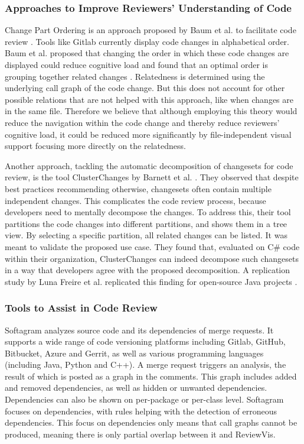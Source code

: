 \documentclass[a4paper,11pt,twoside]{article}
\theoremstyle{definition} %
\renewcommand{\cite}[1]{\citep{#1}}
\begin{document}
\subsubsection{Approaches to Improve Reviewers’ Understanding of Code} \label{SubSubSec:ImprovCodeUnderstanding}
Change Part Ordering is an approach proposed by Baum et al. to facilitate code review \cite{baum2017optimal}. Tools like Gitlab currently display code changes in alphabetical order. Baum et al. proposed that changing the order in which these code changes are displayed could reduce cognitive load and found that an optimal order is grouping together related changes \cite{baum2017optimal}. Relatedness is determined using the underlying call graph of the code change. But this does not account for other possible relations that are not helped with this approach, like when changes are in the same file. Therefore we believe that although employing this theory would reduce the navigation within the code change and thereby reduce reviewers’ cognitive load, it could be reduced more significantly by file-independent visual support focusing more directly on the relatedness. 

Another approach, tackling the automatic decomposition of changesets for code review, is the tool ClusterChanges by Barnett et al. \cite{7194568}. They observed that despite best practices recommending otherwise, changesets often contain multiple independent changes. This complicates the code review process, because developers need to mentally decompose the changes. To address this, their tool partitions the code changes into different partitions, and shows them in a tree view. By selecting a specific partition, all related changes can be listed. It was meant to validate the proposed use case. They found that, evaluated on C\# code within their organization, ClusterChanges can indeed decompose such changesets in a way that developers agree with the proposed decomposition. A replication study by Luna Freire et al. replicated this finding for open-source Java projects \cite{10.1007/978-3-319-73117-9_18}.

\subsubsection{Tools to Assist in Code Review } \label{SubSubSec:CodeRevTools}
Softagram analyzes source code and its dependencies of merge requests. It supports a wide range of code versioning platforms including Gitlab, GitHub, Bitbucket, Azure and Gerrit, as well as various programming languages (including Java, Python and C++). A merge request triggers an analysis, the result of which is posted as a graph in the comments. This graph includes added and removed dependencies, as well as hidden or unwanted dependencies. Dependencies can also be shown on per-package or per-class level. Softagram focuses on dependencies, with rules helping with the detection of erroneous dependencies. This focus on dependencies only means that call graphs cannot be produced, meaning there is only partial overlap between it and ReviewVis. 
\end{document}
